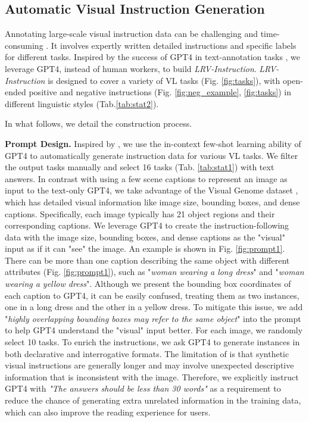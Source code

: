 \subsection{Automatic Visual Instruction Generation}
Annotating large-scale visual instruction data can be challenging and time-consuming \cite{wang2022self}. 
 It involves expertly written detailed instructions and specific labels for different tasks. Inspired by the success of GPT4 in text-annotation tasks \cite{gilardi2023chatgpt}, we leverage GPT4, instead of human  workers, to build \textit{LRV-Instruction}. \textit{LRV-Instruction} is designed to cover a variety of VL tasks (Fig. \ref{fig:tasks}), with open-ended positive and negative instructions (Fig. \ref{fig:neg_example}, \ref{fig:tasks}) in different linguistic styles (Tab.\ref{tab:stat2}).

In what follows, we detail the construction process.

\textbf{Prompt Design.} Inspired by \cite{wang2022self}, we use the in-context few-shot learning ability of GPT4 to automatically generate instruction data for various VL tasks. We filter the output tasks manually and select 16 tasks (Tab. \ref{tab:stat1}) with text answers.  In contrast with  \cite{liu2023visual} using a few scene captions to represent an image as input to the text-only GPT4, we take advantage of the Visual Genome dataset \cite{krishna2017visual}, which has detailed visual information like image size, bounding boxes, and dense captions. Specifically, each image typically has 21 object regions and their corresponding captions. We leverage GPT4 %
to create the instruction-following data with the image size, bounding boxes, and dense captions as the "visual" input as if it can "see" the image. An example is shown in Fig. \ref{fig:prompt1}. There can be more than one caption describing the same object with different attributes (Fig. \ref{fig:prompt1}), such as "\textit{woman wearing a long dress}" and "\textit{woman wearing a yellow dress}". Although we present the bounding box coordinates of each caption to GPT4, it can be easily confused, treating them as two instances, one in a long dress and the other in a yellow dress.
To mitigate this issue, we add "\textit{highly overlapping bounding boxes may refer to the same object}" into the prompt to help GPT4 understand the "visual" input better. For each image, we randomly select 10 tasks. 
To enrich the instructions, we ask GPT4 to generate instances in both declarative and interrogative formats. The limitation of \cite{liu2023visual, zhu2023minigpt} is that synthetic visual instructions are generally longer and may involve unexpected descriptive information that is inconsistent with the image. Therefore, we explicitly instruct GPT4 with \textit{"The answers should be less than 30 words"} as a requirement to reduce the chance of generating extra unrelated information in the training data, which can also improve the reading experience for users.

